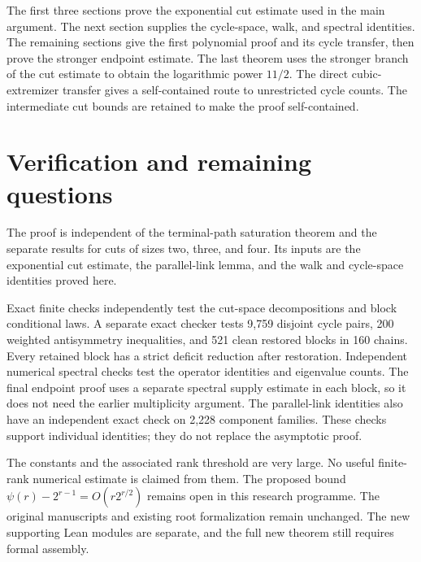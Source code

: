 \documentclass[11pt]{article}
\begin{document}
The first three sections prove the exponential cut estimate used in the main argument.
The next section supplies the cycle-space, walk, and spectral identities.
The remaining sections give the first polynomial proof and its cycle transfer, then prove the stronger endpoint estimate.
The last theorem uses the stronger branch of the cut estimate to obtain the logarithmic power $11/2$.
The direct cubic-extremizer transfer gives a self-contained route to unrestricted cycle counts.
The intermediate cut bounds are retained to make the proof self-contained.

\clearpage
\tableofcontents









\section{Verification and remaining questions}
The proof is independent of the terminal-path saturation theorem and the separate results for cuts of sizes two, three, and four.
Its inputs are the exponential cut estimate, the parallel-link lemma, and the walk and cycle-space identities proved here.

Exact finite checks independently test the cut-space decompositions and block conditional laws.
A separate exact checker tests 9,759 disjoint cycle pairs, 200 weighted antisymmetry inequalities, and 521 clean restored blocks in 160 chains.
Every retained block has a strict deficit reduction after restoration.
Independent numerical spectral checks test the operator identities and eigenvalue counts.
The final endpoint proof uses a separate spectral supply estimate in each block, so it does not need the earlier multiplicity argument.
The parallel-link identities also have an independent exact check on 2,228 component families.
These checks support individual identities; they do not replace the asymptotic proof.

The constants and the associated rank threshold are very large.
No useful finite-rank numerical estimate is claimed from them.
The proposed bound $\psi(r)-2^{r-1}=O(r2^{r/2})$ remains open in this research programme.
The original manuscripts and existing root formalization remain unchanged.
The new supporting Lean modules are separate, and the full new theorem still requires formal assembly.
\end{document}
